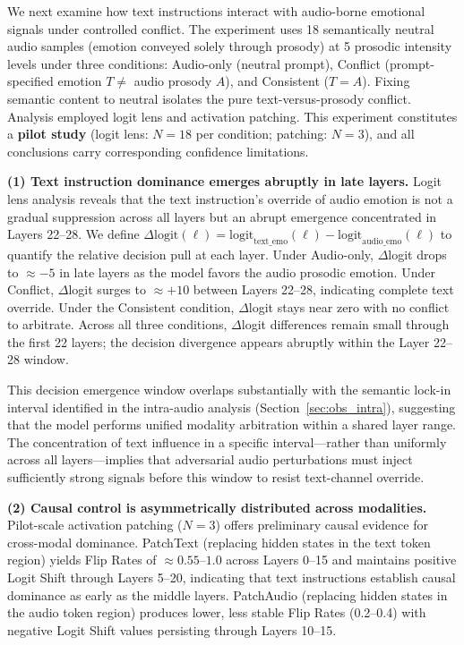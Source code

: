 We next examine how text instructions interact with audio-borne emotional signals under controlled conflict. The experiment uses 18 semantically neutral audio samples (emotion conveyed solely through prosody) at 5 prosodic intensity levels under three conditions: Audio-only (neutral prompt), Conflict (prompt-specified emotion $T \neq$ audio prosody $A$), and Consistent ($T = A$). Fixing semantic content to neutral isolates the pure text-versus-prosody conflict. Analysis employed logit lens and activation patching. This experiment constitutes a \textbf{pilot study} (logit lens: $N=18$ per condition; patching: $N=3$), and all conclusions carry corresponding confidence limitations.

\textbf{(1) Text instruction dominance emerges abruptly in late layers.} Logit lens analysis reveals that the text instruction's override of audio emotion is not a gradual suppression across all layers but an abrupt emergence concentrated in Layers 22--28. We define $\Delta\text{logit}(\ell) = \text{logit}_{\text{text\_emo}}(\ell) - \text{logit}_{\text{audio\_emo}}(\ell)$ to quantify the relative decision pull at each layer. Under Audio-only, $\Delta$logit drops to $\approx -5$ in late layers as the model favors the audio prosodic emotion. Under Conflict, $\Delta$logit surges to $\approx +10$ between Layers 22--28, indicating complete text override. Under the Consistent condition, $\Delta$logit stays near zero with no conflict to arbitrate. Across all three conditions, $\Delta$logit differences remain small through the first 22 layers; the decision divergence appears abruptly within the Layer 22--28 window.

This decision emergence window overlaps substantially with the semantic lock-in interval identified in the intra-audio analysis (Section~\ref{sec:obs_intra}), suggesting that the model performs unified modality arbitration within a shared layer range. The concentration of text influence in a specific interval---rather than uniformly across all layers---implies that adversarial audio perturbations must inject sufficiently strong signals before this window to resist text-channel override.


\textbf{(2) Causal control is asymmetrically distributed across modalities.} Pilot-scale activation patching ($N=3$) offers preliminary causal evidence for cross-modal dominance. PatchText (replacing hidden states in the text token region) yields Flip Rates of $\approx 0.55$--$1.0$ across Layers 0--15 and maintains positive Logit Shift through Layers 5--20, indicating that text instructions establish causal dominance as early as the middle layers. PatchAudio (replacing hidden states in the audio token region) produces lower, less stable Flip Rates (0.2--0.4) with negative Logit Shift values persisting through Layers 10--15.

